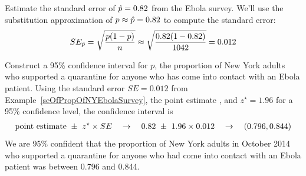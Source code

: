 \begin{examplewrap}
\begin{nexample}{Estimate the standard error of
    $\hat{p} = 0.82{}$ from the Ebola survey.}
  \label{seOfPropOfNYEbolaSurvey}%
  We'll use the substitution approximation of
  $p \approx \hat{p} = 0.82{}$ to compute
  the standard error:
  \begin{align*}
  SE_{\hat{p}}
    = \sqrt{\frac{p(1-p)}{n}}
    \approx \sqrt{\frac{0.82{}
        (1 - 0.82{})}{1042{}}}
    = 0.012{}
  \end{align*}
\end{nexample}
\end{examplewrap}

\begin{examplewrap}
\begin{nexample}{Construct a 95\% confidence interval for $p$,
    the proportion of New York adults who supported a quarantine
    for anyone who has come into contact with an Ebola patient.}
  \label{ex_ci_ny_ebola_quarantine}%
  Using the standard error $SE = 0.012$ from
  Example~\ref{seOfPropOfNYEbolaSurvey},
  the point estimate \wsjebolapollprop{}, and $z^{\star} = 1.96$
  for a 95\% confidence level, the confidence interval is
  \begin{eqnarray*}
  \text{point estimate} \ \pm\ z^{\star} \times SE
    \quad\to\quad 0.82{} \ \pm\ 1.96\times 0.012{}
    \quad\to\quad (0.796, 0.844)
  \end{eqnarray*}
  We are 95\% confident that the proportion of New York adults
  in October 2014 who supported a quarantine for anyone who had come
  into contact with an Ebola patient was between 0.796 and 0.844.
\end{nexample}
\end{examplewrap}

